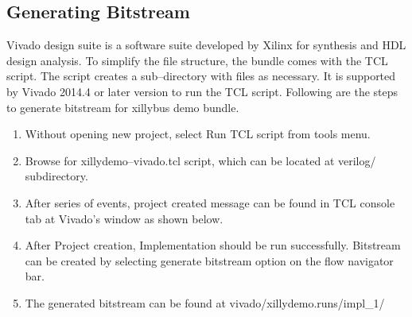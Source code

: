 \subsection{Generating Bitstream}
Vivado design suite is a software suite developed by Xilinx for synthesis and HDL design analysis. To simplify the file structure, the bundle comes with the TCL script. The script creates a sub--directory with files as necessary. It is supported by Vivado 2014.4 or later version to run the TCL script. Following are the steps to generate bitstream for xillybus demo bundle.
\begin{enumerate}\itemsep0em 
\item Without opening new project, select Run TCL script from tools menu.
\item Browse for xillydemo--vivado.tcl script, which can be located at verilog/ subdirectory.
\item After series of events, project created message can be found in TCL console tab at Vivado's window as shown below.
	
\item After Project creation, Implementation should be run successfully. Bitstream can be created by selecting generate bitstream option on the flow navigator bar.
\item	The generated bitstream can be found at vivado/xillydemo.runs/impl\_1/
\end{enumerate}

